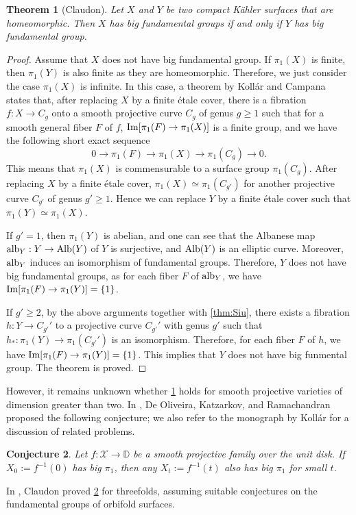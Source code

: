 \documentclass[english]{amsproc}
\theoremstyle{plain}
\newtheorem{thm}{Theorem}[section]
\newtheorem{conjecture}[thm]{Conjecture}
\theoremstyle{definition}
\theoremstyle{remark}
\theoremstyle{plain}
\numberwithin{equation}{thm} %
\newcommand{\sX}{\mathscr{X}}
\newcommand{\bD}{\mathbb{D}}
\begin{document}
\begin{thm}[Claudon]\label{thm:Claudon}
	Let $X$ and $Y$ be two compact K\"ahler surfaces that are homeomorphic. Then $X$ has big fundamental groups if and only if $Y$  has big fundamental group. 
\end{thm}  
\begin{proof}
	Assume that  $X$ does not have big fundamental group. If $\pi_1(X)$ is finite, then $\pi_1(Y)$ is also finite as they are  homeomorphic. Therefore, we just consider the case $\pi_1(X)$ is infinite. In this case, a theorem by Koll\'ar \cite{Kol93} 
	and Campana \cite{Cam94} states that, after replacing $X$ by a finite \'etale cover,  there is a fibration $f:X\to C_g$ onto a smooth projective curve $C_g$ of genus  $g\geq 1$  such that for  a  smooth general  fiber $F$ of $f$,  ${\rm Im}[\pi_1(F)\to \pi_1(X)]$ is a finite group, and we have the following short exact sequence
	$$
	0\to \pi_1(F)\to \pi_1(X)\to \pi_1(C_g) \to 0.
	$$ 
	This means that $\pi_1(X)$ is commensurable to a surface group $\pi_1(C_g)$.   After replacing $X$ by a finite \'etale cover,  $\pi_1(X)\simeq \pi_1(C_{g'})$ for another  projective curve $C_{g'}$ of genus $g'\geq 1$.  Hence we can replace $Y$ by a finite \'etale cover such that $\pi_1(Y)\simeq \pi_1(X)$.  
	
	If $g'=1$, then $\pi_1(Y)$ is abelian,  and  one can see that   the Albanese map ${\rm alb}_Y:Y\to {\rm Alb}(Y)$ of $Y$  is surjective, and  ${\rm Alb}(Y)$ is an elliptic curve.  Moreover, ${\rm alb}_Y$ induces an isomorphism of fundamental groups. Therefore, $Y$ does not have big  fundamental groups, as for each fiber $F$ of ${\rm alb}_Y$, we have ${\rm Im}[\pi_1(F)\to \pi_1(Y)]=\{1\}$. 
	
	If $g'\geq 2$, by the above arguments together with \cref{thm:Siu}, there exists a fibration $h:Y\to C_{g'}'$ to a projective curve $C_{g'}'$ with genus $g'$ such that $h_*:\pi_1(Y)\to \pi_1(C_{g'}')$ is an isomorphism. Therefore, for each fiber $F$ of $h$, we have ${\rm Im}[\pi_1(F)\to \pi_1(Y)]=\{1\}$.  This implies that $Y$ does not have big funmental group.  The theorem is proved.  
\end{proof}
However, it remains unknown whether \cref{thm:Claudon} holds for smooth projective varieties of dimension greater than two. In \cite{DOKR}, De Oliveira, Katzarkov, and Ramachandran proposed the following conjecture; we also refer to the monograph by Koll\'ar \cite{Kol95} for a discussion of related problems.
\begin{conjecture}\label{conj:kat}
	Let $f:\sX\to\bD$ be a smooth projective family over the unit disk. If $X_0:=f^{-1}(0)$ has big $\pi_1$, then any $X_t:=f^{-1}(t)$ also has big $\pi_1$ for small $t$. 
\end{conjecture}
In \cite{Cla10}, Claudon proved \cref{conj:kat} for threefolds, assuming suitable conjectures on the fundamental groups of orbifold surfaces.
\end{document}
